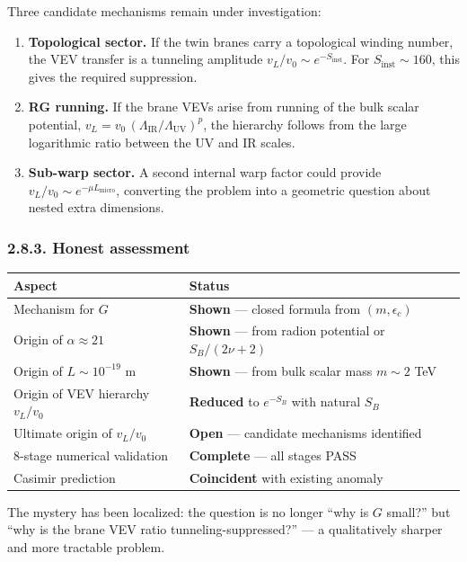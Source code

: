 \documentclass[
  11pt,
]{article}
\begin{document}
Three candidate mechanisms remain under investigation:

\begin{enumerate}
\def\labelenumi{\arabic{enumi}.}
\item
  \textbf{Topological sector.} If the twin branes carry a topological
  winding number, the VEV transfer is a tunneling amplitude
  \(v_L/v_0 \sim e^{-S_{\text{inst}}}\). For
  \(S_{\text{inst}} \sim 160\), this gives the required suppression.
\item
  \textbf{RG running.} If the brane VEVs arise from running of the bulk
  scalar potential,
  \(v_L = v_0\,(\Lambda_{\text{IR}}/\Lambda_{\text{UV}})^p\), the
  hierarchy follows from the large logarithmic ratio between the UV and
  IR scales.
\item
  \textbf{Sub-warp sector.} A second internal warp factor could provide
  \(v_L/v_0 \sim e^{-\mu L_{\text{micro}}}\), converting the problem
  into a geometric question about nested extra dimensions.
\end{enumerate}

\hypertarget{honest-assessment}{%
\subsubsection{2.8.3. Honest assessment}\label{honest-assessment}}

\begin{longtable}[]{@{}ll@{}}
\toprule
Aspect & Status\tabularnewline
\midrule
\endhead
Mechanism for \(G\) & \textbf{Shown} --- closed formula from
\((m, \epsilon_c)\)\tabularnewline
Origin of \(\alpha \approx 21\) & \textbf{Shown} --- from radion
potential or \(S_B/(2\nu+2)\)\tabularnewline
Origin of \(L \sim 10^{-19}\) m & \textbf{Shown} --- from bulk scalar
mass \(m \sim 2\) TeV\tabularnewline
Origin of VEV hierarchy \(v_L/v_0\) & \textbf{Reduced} to \(e^{-S_B}\)
with natural \(S_B\)\tabularnewline
Ultimate origin of \(v_L/v_0\) & \textbf{Open} --- candidate mechanisms
identified\tabularnewline
8-stage numerical validation & \textbf{Complete} --- all stages
PASS\tabularnewline
Casimir prediction & \textbf{Coincident} with existing
anomaly\tabularnewline
\bottomrule
\end{longtable}

The mystery has been localized: the question is no longer ``why is \(G\)
small?'' but ``why is the brane VEV ratio tunneling-suppressed?'' --- a
qualitatively sharper and more tractable problem.

\bigskip
\end{document}
